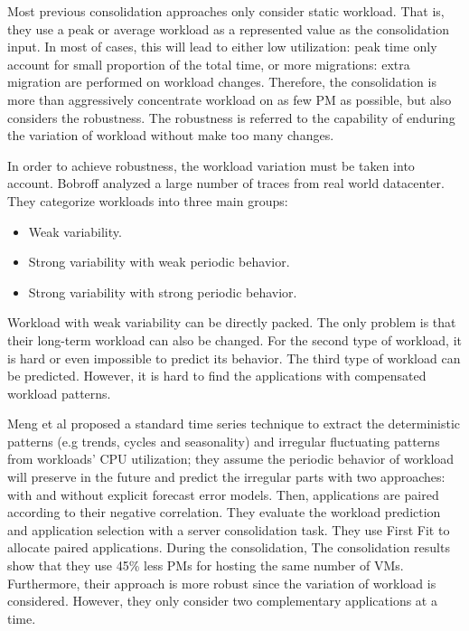 Most previous consolidation approaches \cite{Viswanathan:2012ej, Chen:2011fl,Feller:2011vs} only consider static workload. That is, they use a peak or average workload as a represented value as the consolidation input. In most of cases, this will lead to either low utilization: peak time only account for small proportion of the total time, or more migrations: extra migration are performed on workload changes. 
Therefore, the consolidation is more than aggressively concentrate workload on as few PM as possible, but also considers the robustness. The robustness is referred to the capability of enduring the variation of workload without make too many changes.

In order to achieve robustness, the workload variation must be taken into account. Bobroff \cite{Bobroff:2007ec} analyzed a large number of traces from real world datacenter. They categorize workloads into three main groups: 

\begin{itemize}
	\item Weak variability.
	\item Strong variability with weak periodic behavior.
	\item Strong variability with strong periodic behavior.
\end{itemize}
Workload with weak variability can be directly packed. The only problem is that their long-term workload can also be changed. 
For the second type of workload, it is hard or even impossible to predict its behavior. The third type of workload can be predicted. However, it is hard to find the applications with compensated workload patterns. 

Meng et al \cite{Meng:2010gh} proposed a standard time series technique to extract the deterministic patterns (e.g trends, cycles and seasonality) and irregular fluctuating patterns from workloads' CPU utilization; they assume the periodic behavior of workload will preserve in the future and predict the irregular parts with two approaches: with and without explicit forecast error models. Then, applications are paired according to their negative correlation. They evaluate the workload prediction and application selection with a server consolidation task. They use First Fit to allocate paired applications. During the consolidation, The consolidation results show that they use 45\% less PMs for hosting the same number of VMs. Furthermore, their approach is more robust since the variation of workload is considered. However, they only consider two complementary applications at a time. 

